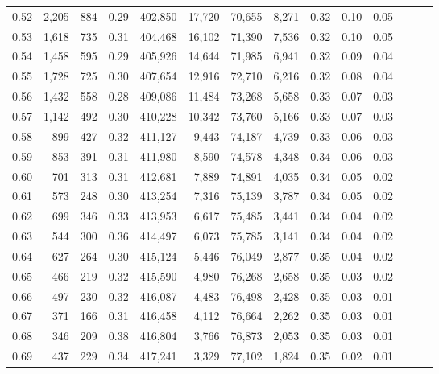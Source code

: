 \begin{tabular}{rrrrrrrrrrrrrr}
0.52 &   2,205 &    884 &  0.29 &  402,850 &   17,720 &  70,655 &   8,271 &  0.32 &  0.10 &      0.05 \\
0.53 &   1,618 &    735 &  0.31 &  404,468 &   16,102 &  71,390 &   7,536 &  0.32 &  0.10 &      0.05 \\
0.54 &   1,458 &    595 &  0.29 &  405,926 &   14,644 &  71,985 &   6,941 &  0.32 &  0.09 &      0.04 \\
0.55 &   1,728 &    725 &  0.30 &  407,654 &   12,916 &  72,710 &   6,216 &  0.32 &  0.08 &      0.04 \\
0.56 &   1,432 &    558 &  0.28 &  409,086 &   11,484 &  73,268 &   5,658 &  0.33 &  0.07 &      0.03 \\
0.57 &   1,142 &    492 &  0.30 &  410,228 &   10,342 &  73,760 &   5,166 &  0.33 &  0.07 &      0.03 \\
0.58 &     899 &    427 &  0.32 &  411,127 &    9,443 &  74,187 &   4,739 &  0.33 &  0.06 &      0.03 \\
0.59 &     853 &    391 &  0.31 &  411,980 &    8,590 &  74,578 &   4,348 &  0.34 &  0.06 &      0.03 \\
0.60 &     701 &    313 &  0.31 &  412,681 &    7,889 &  74,891 &   4,035 &  0.34 &  0.05 &      0.02 \\
0.61 &     573 &    248 &  0.30 &  413,254 &    7,316 &  75,139 &   3,787 &  0.34 &  0.05 &      0.02 \\
0.62 &     699 &    346 &  0.33 &  413,953 &    6,617 &  75,485 &   3,441 &  0.34 &  0.04 &      0.02 \\
0.63 &     544 &    300 &  0.36 &  414,497 &    6,073 &  75,785 &   3,141 &  0.34 &  0.04 &      0.02 \\
0.64 &     627 &    264 &  0.30 &  415,124 &    5,446 &  76,049 &   2,877 &  0.35 &  0.04 &      0.02 \\
0.65 &     466 &    219 &  0.32 &  415,590 &    4,980 &  76,268 &   2,658 &  0.35 &  0.03 &      0.02 \\
0.66 &     497 &    230 &  0.32 &  416,087 &    4,483 &  76,498 &   2,428 &  0.35 &  0.03 &      0.01 \\
0.67 &     371 &    166 &  0.31 &  416,458 &    4,112 &  76,664 &   2,262 &  0.35 &  0.03 &      0.01 \\
0.68 &     346 &    209 &  0.38 &  416,804 &    3,766 &  76,873 &   2,053 &  0.35 &  0.03 &      0.01 \\
0.69 &     437 &    229 &  0.34 &  417,241 &    3,329 &  77,102 &   1,824 &  0.35 &  0.02 &      0.01 \\

\end{tabular}

